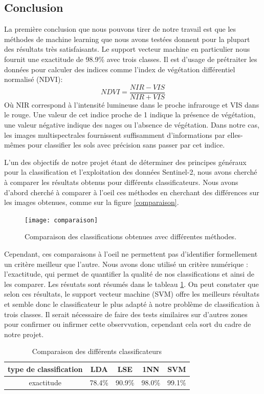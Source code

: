 \documentclass[a4paper,10pt]{article}
\begin{document}
\subsection{Conclusion}
La première conclusion que nous pouvons tirer de notre travail est que les méthodes de machine learning que nous avons testées donnent pour la plupart des résultats très satisfaisants. Le support vecteur machine en particulier nous fournit une exactitude de 98.9\% avec trois classes. Il est d'usage de prétraiter les données pour calculer des indices comme l'index de végétation différentiel normalisé (NDVI)\cite{NDVI}:
\begin{equation}
NDVI=\frac{NIR-VIS}{NIR+VIS}
\end{equation}
Où NIR correspond à l'intensité lumineuse dans le proche infrarouge et VIS dans le rouge. Une valeur de cet indice proche de 1 indique la présence de végétation, une valeur négative indique des nages ou l'absence de végétation. Dans notre cas, les images multispectrales fournissent suffisamment d'informations par elles-mêmes pour classifier les sols avec précision sans passer par cet indice.

L'un des objectifs de notre projet étant de déterminer des principes généraux pour la classification et l'exploitation des données Sentinel-2, nous avons cherché à comparer les résultats obtenus pour différents classificateurs. Nous avons d'abord cherché à comparer à l'oeil ces méthodes en cherchant des différences sur les images obtenues, comme sur la figure \ref{comparaison}.

\begin{figure}
  \centering
    \texttt{[image: comparaison]}
  \caption{Comparaison des classifications obtenues avec différentes méthodes.}
  \label{fig:comparaison}
\end{figure}
Cependant, ces comparaisons à l'oeil ne permettent pas d'identifier formellement un critère meilleur que l'autre. Nous avons donc utilisé un critère numérique : l'exactitude, qui permet de quantifier la qualité de nos classifications et ainsi de les comparer. Les résutats sont résumés dans le tableau \ref{table:comp}. On peut constater que selon ces résultats, le support vecteur machine (SVM) offre les meilleurs résultats et semble donc le classificateur le plus adapté à notre problème de classification à trois classes. Il serait nécessaire de faire des tests similaires sur d'autres zones pour confirmer ou infirmer cette observvation, cependant cela sort du cadre de notre projet.

\begin{table}
\begin{center}
 \begin{tabular}{|c|c|c|c|c|}
  \hline
  type de classification & LDA & LSE & 1NN & SVM \\
  \hline
exactitude & 78.4\% & 90.9\% & 	98.0\% & 99.1\% \\
  \hline
  \end{tabular}
\end{center}
\label{table:comp}
\caption{Comparaison des différents classificateurs}
\end{table}
\end{document}
